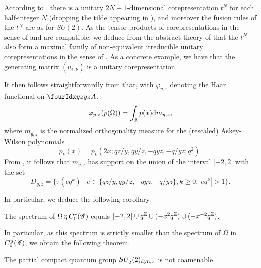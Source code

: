 According to \cite{KoR1}, there is a unitary $2N+1$-dimensional corepresentation $t^N$ for each half-integer $N$ (dropping the tilde appearing in \cite{KoR1}), and moreover the fusion rules of the $t^N$ are as for $SU(2)$. As the tensor products of corepresentations in the sense of \cite{KoR1} and \cite{DCT1} are compatible, we deduce from the abstract theory of \cite{DCT1} that the $t^N$ also form a maximal family of non-equivalent irreducible unitary corepresentations in the sense of \cite{DCT1}. %
As a concrete example, we have that the generating matrix $(u_{\epsilon,\nu})$ is a unitary corepresentation.


It then follows straightforwardly from \cite[Section 7]{KoR1} that, with $\varphi_{y,z}$ denoting the Haar functional on $\Gr{A}{y}{y}{z}{z}$, \[\varphi_{y,z}(p(\Omega)) = \int_{\mathbb{R}} p(x)\mathrm{d} m_{y,z},\] where $m_{y,z}$ is the normalized orthogonality measure for the (rescaled) Askey-Wilson polynomials \[p_k(x) = p_k(2x;qz/y,qy/z,-qyz,-q/yz;q^2).\]  From \cite[Theorem 2.1 and Theorem 2.5]{AsW1}%
, it follows that $m_{y,z}$ has support on the union of the interval $\lbrack -2,2\rbrack$ with the set \[D_{y,z} = \{\tau(eq^k)\mid e\in \{qz/y,qy/z,-qyz,-q/yz\}, k\geq 0, |eq^k|>1\}.\]

In particular, we deduce the following corollary.

\begin{Cor} The spectrum of $\Omega \,\eta\, C^{r}_{0}(\mathscr{G})$ equals $\lbrack -2,2\rbrack \cup q^{\mathbb{Z}} \cup (-x^2q^{\mathbb{Z}})\cup (-x^{-2}q^{\mathbb{Z}})$.
\end{Cor} 

In particular, as this spectrum is strictly smaller than the spectrum of $\Omega$ in $C^{u}_{0}(\mathscr{G})$, we obtain the following theorem.

\begin{Theorem} The partial compact quantum group $SU_q(2)_{\operatorname{\mathrm{dyn}},x}$ is not coamenable.
\end{Theorem} 




